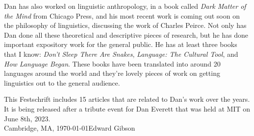 \begin{refsection}
Dan has also worked on linguistic anthropology, in a book called \textit{Dark Matter of the Mind} from Chicago Press, and his most recent work is coming out soon on the philosophy of linguistics, discussing the work of Charles Peirce.  Not only has Dan done all these theoretical and descriptive pieces of research, but he has done important expository work for the general public. He has at least three books that I know: \textit{Don't Sleep There Are Snakes}, \textit{Language: The Cultural Tool}, and \textit{How Language Began}. These books have been translated into around 20 languages around the world and they're lovely pieces of work on getting linguistics out to the general audience. 

This Festschrift includes 15 articles that are related to Dan's work over the years. It is being released after a tribute event for Dan Everett that was held at MIT on June 8th, 2023.\bigskip\\
\noindent Cambridge, MA, \today\hfill Edward Gibson %

{\sloppy\printbibliography[heading=subbibliography]}
\end{refsection}
